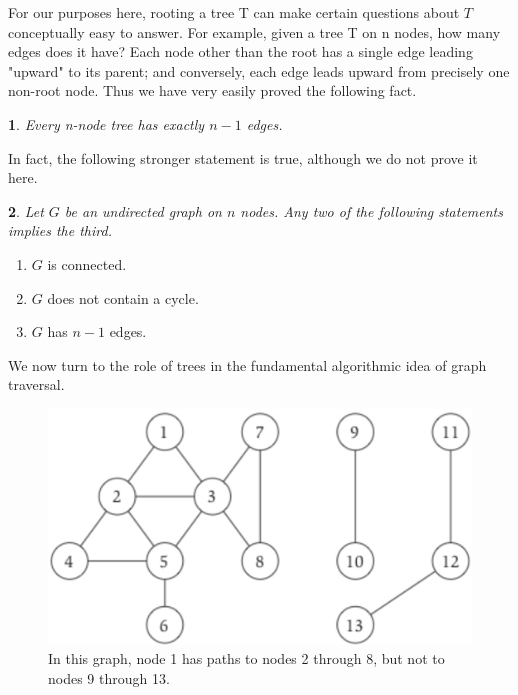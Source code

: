 \documentclass[12pt,a4paper]{book}
\newtheorem{lemma}{}[chapter]
\begin{document}
For our purposes here, rooting a tree T can make certain questions about $T$ conceptually easy to answer. For example, given a tree T on n nodes, how many edges does it have? Each node other than the root has a single edge leading "upward" to its parent; and conversely, each edge leads upward from precisely one non-root node. Thus we have very easily proved the following fact.
\begin{lemma}
Every n-node tree has exactly $n - 1$ edges.\par
\end{lemma}
In fact, the following stronger statement is true, although we do not prove it here.
\begin{lemma}
Let $G$ be an undirected graph on $n$ nodes. Any two of the following statements implies the third.
\end{lemma}
\begin{enumerate}
\item $G$ is connected.
\item $G$ does not contain a cycle.
\item $G$ has $n - 1$ edges.
\end{enumerate}
We now turn to the role of trees in the fundamental algorithmic idea of graph traversal.
\begin{figure}[h]
    \centering
    \label{fig:simpleGraph2}
    \includegraphics[width=\textwidth]{simpleGraph2}
    \caption{ In this graph, node 1 has paths to nodes 2 through 8, but not to nodes 9 through 13.}
\end{figure}
\end{document}
